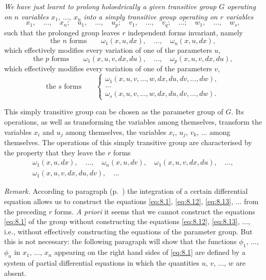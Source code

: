 \emph{We have just learnt to prolong holoedrically a given transitive group $G$ operating on $n$ variables $x_{1}$, $\dots$, $x_{n}$ into a simply transitive group operating on $r$ variables}
\[
x_{1},\quad\dots,\quad x_{n};\quad u_{1},\quad\dots,\quad u_{p};\quad v_{1},\quad\dots,\quad v_{q};\quad\dots;\quad w_{1},\quad \dots,\quad w_{s},
\]
such that the prolonged group leaves $r$ independent forms invariant, namely 
\[
\text{the $n$ forms}\qquad\omega_{1}(x,u,dx),\quad\dots,\quad\omega_{n}(x,u,dx),
\]
which effectively modifies every variation of one of the parameters $u$,
\[
\text{the $p$ forms}\qquad\omega_{1}(x,u,v,dx,du),\quad\dots,\quad\omega_{p}(x,u,v,dx,du),
\]
which effectively modifies every variation of one of the parameters $v$,
\[
\text{the $s$ forms}\qquad\left\{
  \begin{gathered}
    \omega_{1}(x,u,v,\dots,w,dx,du,dv,\dots,dw),\\
    \dots\\
    \omega_{s}(x,u,v,\dots,w,dx,du,dv,\dots,dw).
  \end{gathered}
\right.
\]

\somespace

This simply transitive group can be chosen as the parameter group of $G$. Its operations, as well as transforming the variables among themselves, transform the variables $x_{i}$ and $u_{j}$ among themselves, the variables $x_{i}$, $u_{j}$, $v_k$, $\dots$ among themselves. The operations of this simply transitive group are characterised by the property that they leave the $r$ forms
\begin{gather*}
  \omega_{1}(x,u,dx),\quad\dots,\quad\omega_{n}(x,u,dv),\quad\omega_{1}(x,u,v,dx,du),\quad\dots,\\
  \omega_{1}(x,u,v,dx,du,dv),\quad\dots
\end{gather*}

\somespace

\emph{Remark.} According to paragraph  (p.~\pageref{sec:83}) the integration of a certain differential equation allows us to construct the equations \eqref{eq:8.1}, \eqref{eq:8.12}, \eqref{eq:8.13}, $\dots$ from the preceding $r$ forms. \emph{A priori} it seems that we cannot construct the equations \eqref{eq:8.1} of the group without constructing the equations \eqref{eq:8.12}, \eqref{eq:8.13}, $\dots$, i.e., without effectively constructing the equations of the parameter group. But this is not necessary: the following paragraph will show that the functions $\phi_{1}$, $\dots$, $\phi_{n}$ in $x_{1}$, $\dots$, $x_{n}$ appearing on the right hand sides of \eqref{eq:8.1} are defined by a system of partial differential equations in which the quantities $u$, $v$, $\dots$, $w$ are absent.

